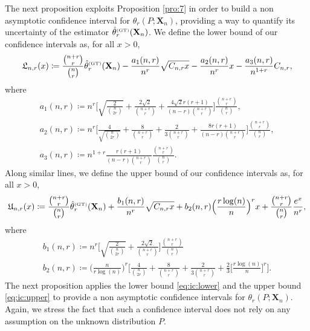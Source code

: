 \documentclass{article}
\newcommand{\1}{\boldsymbol{1}}
\theoremstyle{plain}
\begin{document}
The next proposition exploits Proposition \ref{pro:7} in order to build a non asymptotic confidence interval for $\theta_r(P;\mathbf{X}_n)$, providing a way to quantify its uncertainty of the estimator $\hat{\theta}_{r}^{\text{\tiny{(GT)}}}(\mathbf{X}_{n})$. We define the lower bound of our confidence intervals as, for all $x > 0$,
\begin{equation}
  \label{eq:ic:lower}
  \mathfrak{L}_{n,r}(x)%
  \coloneqq%
  \frac{\binom{n+r}{r}}{\binom{n}{r}}\hat{\theta}_{r}^{\text{\tiny{(GT)}}}(\mathbf{X}_{n})%
  - \frac{a_1(n,r)}{n^r} \sqrt{C_{n,r}x} - \frac{a_2(n,r)}{n^r} x - \frac{a_3(n,r)}{n^{1+r}} C_{n,r},
\end{equation}
where
\begin{gather*}
  a_1(n,r)%
  \coloneqq%
  n^r
  \Bigg[\sqrt{\frac{2}{\binom{n}{2r}}}%
  + \frac{2\sqrt{2}}{\binom{n+r}{r}}%
  + \frac{4\sqrt{2}r (r+1)}{(n-r)\binom{n+r}{r}}
  \Bigg]%
  \frac{\binom{n+r}{r}}{\binom{n}{r}},\\
  a_2(n,r)%
  \coloneqq%
  n^r\Bigg[ \frac{4}{\sqrt{\binom{n}{2r}}}%
  + \frac{8}{\binom{n+r}{r}}%
  + \frac{2}{3\binom{n+r}{r}}%
  + \frac{8 r(r+1)}{(n-r)\binom{n+r}{r}}%
  \Bigg]\frac{\binom{n+r}{r}}{\binom{n}{r}},\\
  a_3(n,r)%
  \coloneqq%
  n^{1+r}\frac{r(r+1)}{(n-r)\binom{n+r}{r}}\frac{\binom{n+r}{r}}{\binom{n}{r}}.
\end{gather*}
Along similar lines, we define the upper bound of our confidence intervals as, for all $x > 0$,
\begin{equation}
  \label{eq:ic:upper}
  \mathfrak{U}_{n,r}(x)%
  \coloneqq%
  \frac{\binom{n+r}{r}}{\binom{n}{r}}\hat{\theta}_{r}^{\text{\tiny{(GT)}}}(\mathbf{X}_{n})%
    + \frac{b_1(n,r)}{n^r} \sqrt{C_{n,r}x} + b_2(n,r)\Big(\frac{r \log(n)}{n} \Big)^r x + \frac{\binom{n+r}{r}}{\binom{n}{r}}\frac{e^x}{n^r},
\end{equation}
where
\begin{gather*}
  b_1(n,r)%
  \coloneqq n^r\Bigg[ \sqrt{\frac{2}{\binom{n}{2r}}} + \frac{2 \sqrt{2}}{\binom{n+r}{r}} \Bigg] \frac{\binom{n+r}{r}}{\binom{n}{r}}\\
  b_2(n,r)%
  \coloneqq \Big(\frac{n}{r \log(n)} \Big)^r\Bigg[\frac{4}{\binom{n}{2r}} + \frac{8}{\binom{n+r}{r}}%
  + \frac{2}{3\binom{n+r}{r}} + \frac{2}{3}\Big[\frac{r \log(n)}{n} \Big]^r
  \Bigg].
\end{gather*}
The next proposition applies the lower bound \eqref{eq:ic:lower} and the upper bound \eqref{eq:ic:upper} to provide a non asymptotic confidence intervals for $\theta_r(P;\mathbf{X}_n)$. Again, we stress the fact that such a confidence interval does not rely on any assumption on the unknown distribution $P$.
\end{document}
